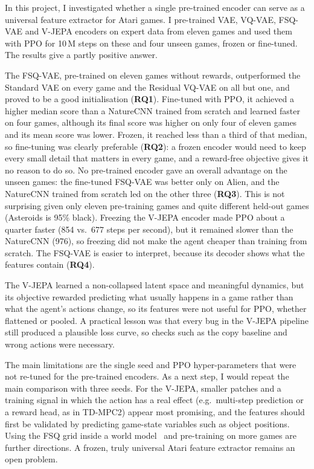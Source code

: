 \documentclass[runningheads]{llncs}
\begin{document}
In this project, I investigated whether a single pre-trained encoder can serve as a universal
feature extractor for Atari games. I pre-trained VAE, VQ-VAE, FSQ-VAE and V-JEPA encoders on
expert data from eleven games and used them with PPO for 10\,M steps on these and four unseen
games, frozen or fine-tuned. The results give a partly positive answer.

The FSQ-VAE, pre-trained on eleven games without rewards, outperformed the Standard VAE on every
game and the Residual VQ-VAE on all but one, and proved to be a good initialisation
(\textbf{RQ1}). Fine-tuned with PPO, it achieved a higher median score than a NatureCNN trained
from scratch and learned faster on four games, although its final score was higher on only
four of eleven games and its mean score was lower. Frozen, it reached less than a third of that
median, so fine-tuning was clearly preferable (\textbf{RQ2}): a frozen encoder would need to
keep every small detail that matters in every game, and a reward-free objective gives it no
reason to do so. No pre-trained encoder gave an overall advantage on the unseen games: the
fine-tuned FSQ-VAE was better only on Alien, and the NatureCNN trained from scratch led on the
other three (\textbf{RQ3}). This is not surprising given only eleven pre-training games and
quite different held-out games (Asteroids is 95\% black). Freezing the V-JEPA encoder made PPO about a quarter
faster (854 vs.\ 677 steps per second), but it remained slower than the NatureCNN (976), so
freezing did not make the agent cheaper than training from scratch. The FSQ-VAE is easier to
interpret, because its decoder shows what the features contain (\textbf{RQ4}).

The V-JEPA learned a non-collapsed latent space and meaningful dynamics, but its objective
rewarded predicting what usually happens in a game rather than what the agent's actions change,
so its features were not useful for PPO, whether flattened or pooled. A practical lesson was that every bug in the V-JEPA pipeline still produced a plausible loss
curve, so checks such as the copy baseline and wrong actions were necessary.

The main limitations are the single seed and PPO hyper-parameters that were not re-tuned for
the pre-trained encoders. As a next step, I would repeat the main comparison with three seeds.
For the V-JEPA, smaller patches and a training signal in which the
action has a real effect (e.g.\ multi-step prediction or a reward head, as in TD-MPC2) appear
most promising, and the features should first be validated by predicting game-state variables
such as object positions. Using the FSQ grid inside a world
model~\cite{hafner2021dreamerv2,micheli2023iris} and pre-training on more games are further
directions. A frozen, truly universal Atari feature extractor remains an open problem.
\end{document}
